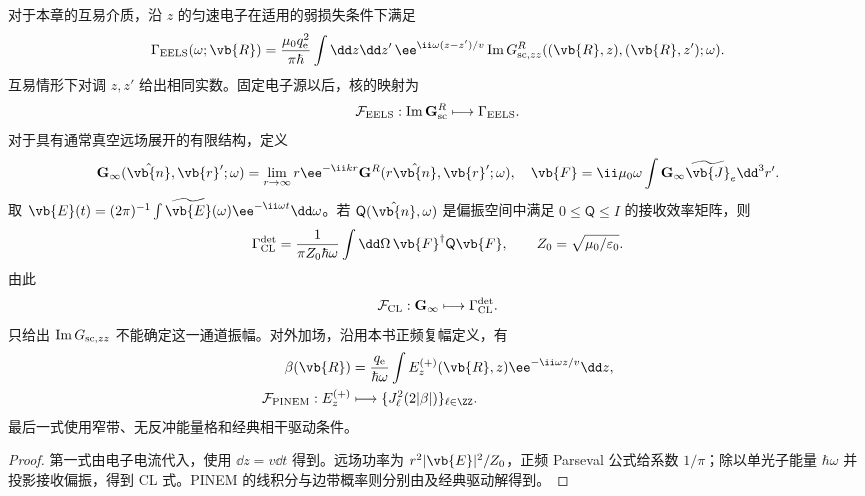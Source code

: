 \begin{proposition}[三种读出的前向泛函]
对于本章的互易介质，沿 $z$ 的匀速电子在适用的弱损失条件下满足
\begin{equation}
\Gamma_{\rm EELS}(\omega;\vb{R})
=\frac{\mu_0q_{\mathrm e}^2}{\pi\hbar}
\int\dd z\dd z'\,\ee^{\ii\omega(z-z')/v}
\operatorname{Im}G^R_{{\rm sc},zz}
((\vb{R},z),(\vb{R},z');\omega).
\label{eq:feqo-eels-forward-green}
\end{equation}
互易情形下对调 $z,z'$ 给出相同实数。固定电子源以后，核的映射为
\begin{equation}
\mathcal F_{\rm EELS}:\operatorname{Im}\mathbf G^R_{\rm sc}\longmapsto\Gamma_{\rm EELS}.
\label{eq:feqo-eels-forward-map}
\end{equation}
对于具有通常真空远场展开的有限结构，定义
\[
\mathbf G_\infty(\hat{\vb{n}},\vb{r}';\omega)
=\lim_{r\to\infty}r\ee^{-\ii kr}\mathbf G^R(r\hat{\vb{n}},\vb{r}';\omega),
\quad
\vb{F}=\ii\mu_0\omega\int\mathbf G_\infty\widetilde{\vb{J}}_e\dd^3r'.
\]
取 $\vb{E}(t)=(2\pi)^{-1}\int\widetilde{\vb{E}}(\omega)\ee^{-\ii\omega t}\dd\omega$。若 $\mathsf Q(\hat{\vb{n}},\omega)$ 是偏振空间中满足 $0\le\mathsf Q\le I$ 的接收效率矩阵，则
\begin{equation}
\Gamma_{\rm CL}^{\rm det}
=\frac{1}{\pi Z_0\hbar\omega}
\int\dd\Omega\,\vb{F}^\dagger\mathsf Q\vb{F},
\qquad Z_0=\sqrt{\mu_0/\varepsilon_0}.
\label{eq:feqo-cl-forward-collection}
\end{equation}
由此
\begin{equation}
\mathcal F_{\rm CL}:\mathbf G_\infty\longmapsto\Gamma_{\rm CL}^{\rm det}.
\label{eq:feqo-cl-forward-map}
\end{equation}
只给出 $\operatorname{Im}G_{{\rm sc},zz}$ 不能确定这一通道振幅。对外加场，沿用本书正频复幅定义，有
\begin{align}
\beta(\vb{R})&=\frac{q_{\mathrm e}}{\hbar\omega}
\int E^{(+)}_z(\vb{R},z)\ee^{-\ii\omega z/v}\dd z,
\label{eq:feqo-pinem-forward-beta}\\
\mathcal F_{\rm PINEM}:E^{(+)}_z&\longmapsto
\{J_\ell^2(2|\beta|)\}_{\ell\in\ZZ}.
\label{eq:feqo-pinem-forward-map}
\end{align}
最后一式使用窄带、无反冲能量格和经典相干驱动条件。
\end{proposition}
\begin{proof}
第一式由电子电流代入，使用 $\dd z=v\dd t$ 得到。远场功率为 $r^2|\vb{E}|^2/Z_0$，正频 Parseval 公式给系数 $1/\pi$；除以单光子能量 $\hbar\omega$ 并投影接收偏振，得到 CL 式。PINEM 的线积分与边带概率则分别由及经典驱动解得到。
\end{proof}


